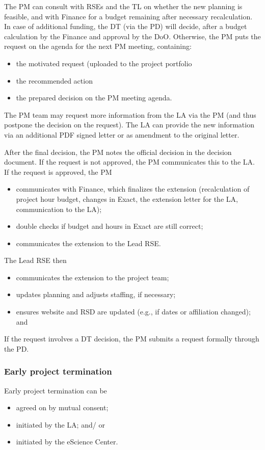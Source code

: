 The PM can consult with RSEs and the TL on whether the new planning is feasible, and with Finance for a budget remaining after necessary recalculation. In case of additional funding, the DT
(via the PD) will decide, after a budget calculation by the Finance and approval by the DoO. Otherwise, the PM puts the
request on the agenda for the next PM meeting, containing: 
\begin{itemize}
\item the motivated request (uploaded to the project portfolio
\item the recommended action
\item the prepared decision on the PM meeting agenda.
\end{itemize}

The PM team may request more information from the LA via the PM (and thus postpone the decision on the request). The LA
can provide the new information via an additional PDF signed letter or as amendment to the original letter.

After the final decision, the PM notes the official decision in the decision document. If the request is not approved,
the PM communicates this to the LA. If the request is approved, the PM
\begin{itemize}
\item communicates with Finance, which finalizes the extension (recalculation of project hour budget, changes in Exact, the extension letter for the LA, communication to the LA);
\item double checks if budget and hours in Exact are still correct;
\item communicates the extension to the Lead RSE.
\end{itemize}  
  The Lead RSE then 
\begin{itemize}  
\item communicates the extension to the project team;
\item updates planning and adjusts staffing, if necessary;
\item ensures website and RSD are updated (e.g., if dates or affiliation changed); and
\end{itemize}

If the request involves a DT decision, the PM submits a request formally through the PD.

\subsubsection{Early project termination}
Early project termination can be
\begin{itemize}
\item agreed on by mutual consent;
\item initiated by the LA; and/ or
\item initiated by the eScience Center.
\end{itemize}

